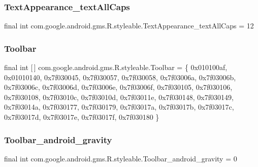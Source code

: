 \subsubsection{\texorpdfstring{Text\+Appearance\+\_\+text\+All\+Caps}{TextAppearance\_textAllCaps}}
{\footnotesize\ttfamily final int com.\+google.\+android.\+gms.\+R.\+styleable.\+Text\+Appearance\+\_\+text\+All\+Caps = 12\hspace{0.3cm}{\ttfamily [static]}}

\mbox{\label{classcom_1_1google_1_1android_1_1gms_1_1R_1_1styleable_acc956142087c373aa9eeafc92e55d84f}} 
\subsubsection{\texorpdfstring{Toolbar}{Toolbar}}
{\footnotesize\ttfamily final int \mbox{[}$\,$\mbox{]} com.\+google.\+android.\+gms.\+R.\+styleable.\+Toolbar = \{ 0x010100af, 0x01010140, 0x7f030045, 0x7f030057, 0x7f030058, 0x7f03006a, 0x7f03006b, 0x7f03006c, 0x7f03006d, 0x7f03006e, 0x7f03006f, 0x7f030105, 0x7f030106, 0x7f030108, 0x7f03010c, 0x7f03010d, 0x7f03011e, 0x7f030148, 0x7f030149, 0x7f03014a, 0x7f030177, 0x7f030179, 0x7f03017a, 0x7f03017b, 0x7f03017c, 0x7f03017d, 0x7f03017e, 0x7f03017f, 0x7f030180 \}\hspace{0.3cm}{\ttfamily [static]}}

\mbox{\label{classcom_1_1google_1_1android_1_1gms_1_1R_1_1styleable_a20e802c612be23ded3f16209f0912a1f}} 
\subsubsection{\texorpdfstring{Toolbar\+\_\+android\+\_\+gravity}{Toolbar\_android\_gravity}}
{\footnotesize\ttfamily final int com.\+google.\+android.\+gms.\+R.\+styleable.\+Toolbar\+\_\+android\+\_\+gravity = 0\hspace{0.3cm}{\ttfamily [static]}}

